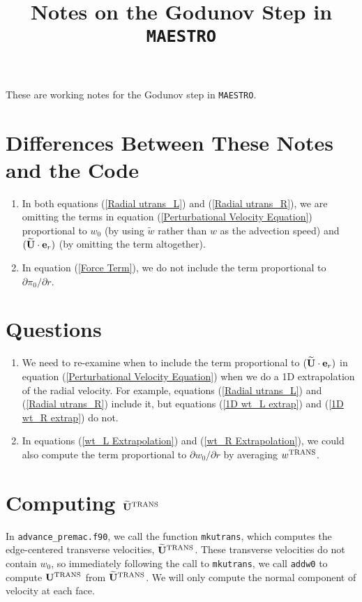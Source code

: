 \documentclass[11pt]{article}
\title{Notes on the Godunov Step in {\tt MAESTRO}}
\def\trans {\rm TRANS}
\def\eb    {{\bf e}}
\def\Ub    {{\bf U}}
\def\Ubt   {\widetilde{\bf U}}
\def\wt    {\tilde{w}}
\begin{document}
\maketitle

These are working notes for the Godunov step in {\tt MAESTRO}.
\section{Differences Between These Notes and the Code}
\begin{enumerate}
\item In both equations (\ref{Radial utrans_L}) and (\ref{Radial utrans_R}), we are omitting the terms in equation (\ref{Perturbational Velocity Equation}) proportional to $w_0$ (by using $\wt$ rather than $w$ as the advection speed) and $(\Ubt\cdot\eb_r)$ (by omitting the term altogether).
\item In equation (\ref{Force Term}), we do not include the term proportional to $\partial\pi_0/\partial r$.
\end{enumerate}
\section{Questions}
\begin{enumerate}
\item We need to re-examine when to include the term proportional to $(\Ubt\cdot\eb_r)$ in equation (\ref{Perturbational Velocity Equation}) when we do a 1D extrapolation of the radial velocity.  For example, equations (\ref{Radial utrans_L}) and (\ref{Radial utrans_R}) include it, but equations (\ref{1D wt_L extrap}) and (\ref{1D wt_R extrap}) do not.
\item In equations (\ref{wt_L Extrapolation}) and (\ref{wt_R Extrapolation}), we could also compute the term proportional to $\partial w_0/\partial r$ by averaging $w^{\trans}$.
\end{enumerate}
\section{Computing $\Ubt^{\trans}$}
In {\tt advance\_premac.f90}, we call the function {\tt mkutrans}, which computes the edge-centered transverse velocities, $\Ubt^{\trans}$.  These transverse velocities do not contain $w_0$, so immediately following the call to {\tt mkutrans}, we call {\tt addw0} to compute $\Ub^{\trans}$ from $\Ubt^{\trans}$.  We will only compute the normal component of velocity at each face.\\
\end{document}
